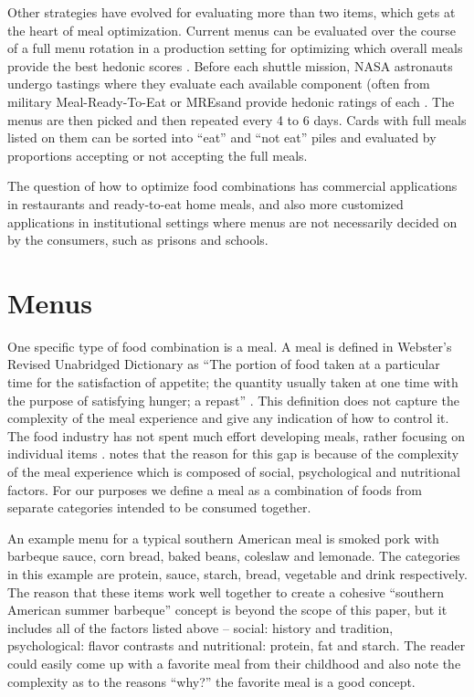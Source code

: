 Other strategies have evolved for evaluating more than two items, which gets at the heart of meal optimization.  Current menus can be evaluated over the course of a full menu rotation in a production setting for optimizing which overall meals provide the best hedonic scores \citep{Pagliarini2005}. Before each shuttle mission, NASA astronauts undergo tastings where they evaluate each available component (often from military Meal-Ready-To-Eat or MREs\tm and provide hedonic ratings of each \citep{Kerwin2002}.  The menus are then picked and then repeated every 4 to 6 days.  Cards with full meals listed on them can be sorted into “eat” and “not eat” piles \citep{Jonsson1991} and evaluated by proportions accepting or not accepting the full meals.

The question of how to optimize food combinations has commercial applications in restaurants and ready-to-eat home meals, and also more customized applications in institutional settings where menus are not necessarily decided on by the consumers, such as prisons and schools.

\section{Menus}
One specific type of food combination is a meal.  A meal is defined in Webster’s Revised Unabridged Dictionary as “The portion of food taken at a particular time for the satisfaction of appetite; the quantity usually taken at one time with the purpose of satisfying hunger; a repast” \citep{Webster1913}.  This definition does not capture the complexity of the meal experience and give any indication of how to control it.  The food industry has not spent much effort developing meals, rather focusing on individual items \citep{Meiselman2000}.  \citet{Meiselman2000} notes that the reason for this gap is because of the complexity of the meal experience which is composed of social, psychological \citep[see][chap. 2]{Lawless2010} and nutritional factors.  For our purposes we define a meal as a combination of foods from separate categories intended to be consumed together. 
 
An example menu for a typical southern American meal is smoked pork with barbeque sauce, corn bread, baked beans, coleslaw and lemonade.  The categories in this example are protein, sauce, starch, bread, vegetable and drink respectively.  The reason that these items work well together to create a cohesive “southern American summer barbeque” concept is beyond the scope of this paper, but it includes all of the factors listed above – social: history and tradition, psychological: flavor contrasts \citep{Lawless1977,Lawless1979,Lawless1987,Lawless2010,Lawless2000} and nutritional: protein, fat and starch.  The reader could easily come up with a favorite meal from their childhood and also note the complexity as to the reasons “why?” the favorite meal is a good concept.  
 
